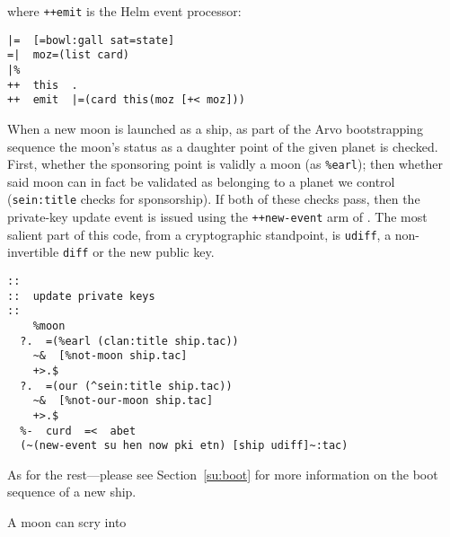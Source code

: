 where \texttt{++emit} is the Helm event processor:

\begin{lstlisting}[style=nonumbers,
                   caption={\texttt{lib/hood/helm.hoon}, line 21–24, 29}]
|=  [=bowl:gall sat=state]
=|  moz=(list card)
|%
++  this  .
++  emit  |=(card this(moz [+< moz]))
\end{lstlisting}


When a new moon is launched as a ship, as part of the Arvo bootstrapping sequence the moon's status as a daughter point of the given planet is checked.  First, whether the sponsoring point is validly a moon (as \texttt{\%earl}); then whether said moon can in fact be validated as belonging to a planet we control (\texttt{sein:title} checks for sponsorship).  If both of these checks pass, then the private-key update event is issued using the \texttt{++new-event} arm of \jael.  The most salient part of this code, from a cryptographic standpoint, is \texttt{udiff}, a non-invertible \texttt{diff} or the new public key.


\begin{lstlisting}
::
::  update private keys
::
    %moon
  ?.  =(%earl (clan:title ship.tac))
    ~&  [%not-moon ship.tac]
    +>.$
  ?.  =(our (^sein:title ship.tac))
    ~&  [%not-our-moon ship.tac]
    +>.$
  %-  curd  =<  abet
  (~(new-event su hen now pki etn) [ship udiff]~:tac)
\end{lstlisting}

As for the rest—please see Section~\ref{su:boot} for more information on the boot sequence of a new ship.

A moon can scry into \jael

